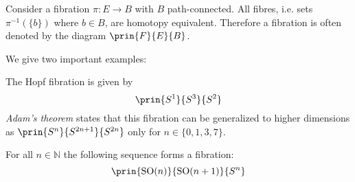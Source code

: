 	\begin{property}
		Consider a fibration $\pi:E\rightarrow B$ with $B$ path-connected. All fibres, i.e. sets $\pi^{-1}(\{b\})$ where $b\in B$, are homotopy equivalent. Therefore a fibration is often denoted by the diagram $\prin{F}{E}{B}$.
	\end{property}
	
	We give two important examples:
	\begin{example}
		The Hopf fibration is given by
		\begin{equation}
			\prin{S^1}{S^3}{S^2}
		\end{equation}
		\textit{Adam's theorem} states that this fibration can be generalized to higher dimensions as $\prin{S^n}{S^{2n+1}}{S^{2n}}$ only for $n\in\{0, 1, 3, 7\}$.
	\end{example}
	\begin{example}
		For all $n\in\mathbb{N}$ the following sequence forms a fibration:
		\begin{equation}
			\prin{\text{SO}(n)}{\text{SO}(n+1)}{S^n}
		\end{equation}
	\end{example}
